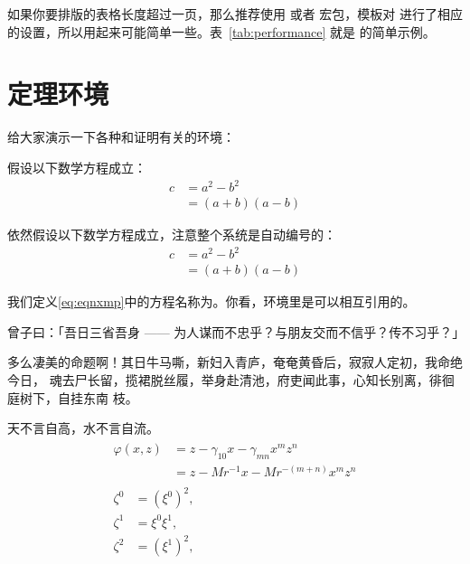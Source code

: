 如果你要排版的表格长度超过一页，那么推荐使用  或者 宏包，模板对  进行了相应的设置，所以用起来可能简单一些。表~\ref{tab:performance} 就是  的简单示例。

\section{定理环境}
\label{sec:theorem}

给大家演示一下各种和证明有关的环境：

\begin{assumption}
	假设以下数学方程成立：
\begin{equation}
\label{eq:eqnxmp}
\begin{split}
c &= a^2 - b^2\\
&= (a+b)(a-b)
\end{split}
\end{equation}
\end{assumption}

\begin{assumption}
	依然假设以下数学方程成立，注意整个系统是自动编号的：
\begin{equation}
\label{eq:eqnxmp2}
\begin{split}
c &= a^2 - b^2\\
&= (a+b)(a-b)
\end{split}
\end{equation}
\end{assumption}

\begin{definition}
	我们定义\ref{eq:eqnxmp}中的方程名称为\cquthesis 。你看，环境里是可以相互引用的。
\end{definition}

\begin{proposition}
	曾子曰：「吾日三省吾身 —— 为人谋而不忠乎？与朋友交而不信乎？传不习乎？」
\end{proposition}

多么凄美的命题啊！其日牛马嘶，新妇入青庐，奄奄黄昏后，寂寂人定初，我命绝今日，
魂去尸长留，揽裙脱丝履，举身赴清池，府吏闻此事，心知长别离，徘徊庭树下，自挂东南
枝。

\begin{remark}
	天不言自高，水不言自流。
	\begin{gather*}
	\begin{split} 
	\varphi(x,z)
	&=z-\gamma_{10}x-\gamma_{mn}x^mz^n\\
	&=z-Mr^{-1}x-Mr^{-(m+n)}x^mz^n
	\end{split}\\[6pt]
	\begin{align} \zeta^0&=(\xi^0)^2,\\
	\zeta^1 &=\xi^0\xi^1,\\
	\zeta^2 &=(\xi^1)^2,
	\end{align}
	\end{gather*}
\end{remark}

